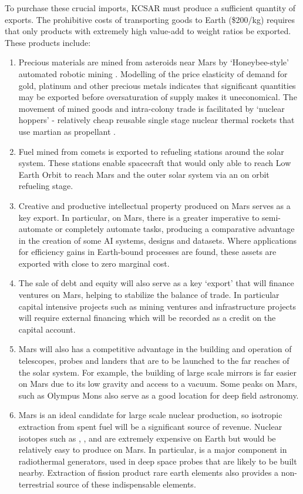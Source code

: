 \documentclass[fleqn,10pt]{Stylesheet} %
\begin{document}
To purchase these crucial imports, KCSAR must produce a sufficient quantity of exports. The prohibitive costs of transporting goods to Earth (\$200/kg) requires that only products with extremely high value-add to weight ratios be exported. These products include:

\begin{enumerate}
\item Precious materials are mined from asteroids near Mars by `Honeybee-style' automated robotic mining \cite{Shaw}. Modelling of the price elasticity of demand for gold, platinum and other precious metals indicates that significant quantities may be exported before oversaturation of supply makes it uneconomical. The movement of mined goods and intra-colony trade is facilitated by `nuclear hoppers' - relatively cheap reusable single stage nuclear thermal rockets that use martian  as propellant \cite{2011Zubrin}.
\item Fuel mined from comets is exported to refueling stations around the solar system. These stations enable spacecraft that would only able to reach Low Earth Orbit to reach Mars and the outer solar system via an on orbit refueling stage.
\item Creative and productive intellectual property produced on Mars serves as a key export. In particular, on Mars, there is a greater imperative to semi-automate or completely automate tasks, producing a comparative advantage in the creation of some AI systems, designs and datasets. Where applications for efficiency gains in Earth-bound processes are found, these assets are exported with close to zero marginal cost.
\item  The sale of debt and equity will also serve as a key ‘export’ that will finance ventures on Mars, helping to stabilize the balance of trade. In particular capital intensive projects such as mining ventures and infrastructure projects will require external financing which will be recorded as a credit on the capital account.
\item Mars will also has a competitive advantage in the building and operation of telescopes, probes and landers that are to be launched to the far reaches of the solar system. For example, the building of large scale mirrors is far easier on Mars due to its low gravity and access to a vacuum. Some peaks on Mars, such as Olympus Mons also serve as a good location for deep field astronomy.
\item Mars is an ideal candidate for large scale nuclear production, so isotropic extraction from spent fuel will be a significant source of revenue. Nuclear isotopes such as , ,  and  are extremely expensive on Earth but would be relatively easy to produce on Mars. In particular,  is a major component in radiothermal generators, used in deep space probes that are likely to be built nearby. Extraction of fission product rare earth elements also provides a non-terrestrial source of these indispensable elements.

\end{enumerate}
\end{document}
